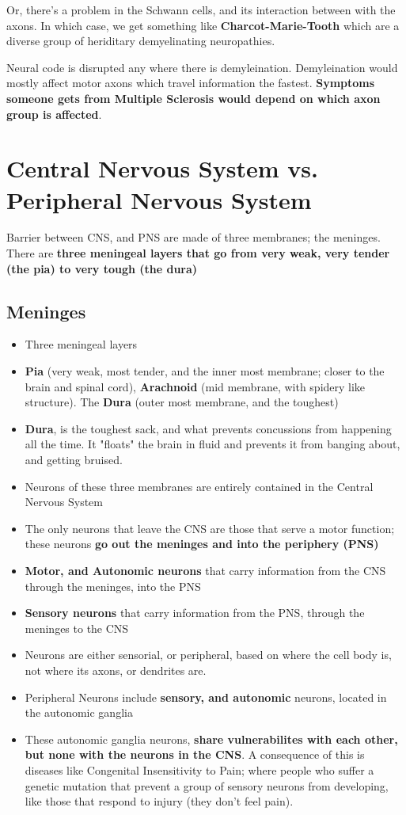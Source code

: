 \documentclass[12pt, a4paper]{article}
\begin{document}
Or, there's a problem in the Schwann cells, and its interaction between with the axons. In which case,
we get something like \textbf{Charcot-Marie-Tooth} which are a diverse group of heriditary demyelinating neuropathies.

Neural code is disrupted any where there is demyleination. Demyleination would mostly affect
motor axons which travel information the fastest. \textbf{Symptoms someone gets from Multiple Sclerosis would
depend on which axon group is affected}.

\section{Central Nervous System vs. Peripheral Nervous System}
Barrier between CNS, and PNS are made of three membranes; the meninges. There are 
\textbf{three meningeal layers that go from very weak, very tender (the pia) to very
tough (the dura)}

\subsection{Meninges}
\begin{itemize}
    \item Three meningeal layers
    \item \textbf{Pia} (very weak, most tender, and the inner most membrane; closer to the brain and spinal cord),
    \textbf{Arachnoid} (mid membrane, with spidery like structure). The \textbf{Dura} (outer most membrane, and the toughest)
    \item \textbf{Dura}, is the toughest sack, and what prevents concussions from happening all the time. It "floats"
    the brain in fluid and prevents it from banging about, and getting bruised.
    \item Neurons of these three membranes are entirely contained in the Central Nervous System
    \item The only neurons that leave the CNS are those that serve a motor function; these neurons
    \textbf{go out the meninges and into the periphery (PNS)}
    \item \textbf{Motor, and Autonomic neurons} that carry information from the CNS through the meninges, into the PNS
    \item \textbf{Sensory neurons} that carry information from the PNS, through the meninges to the CNS
    \item Neurons are either sensorial, or peripheral, based on where the cell body is, not where its
    axons, or dendrites are.
    \item Peripheral Neurons include \textbf{sensory, and autonomic} neurons, located in the autonomic ganglia
    \item These autonomic ganglia neurons, \textbf{share vulnerabilites with each other, but none with the neurons in the CNS}. A 
    consequence of this is diseases like Congenital Insensitivity to Pain; where people who suffer a genetic mutation
    that prevent a group of sensory neurons from developing, like those that respond to injury
    (they don't feel pain). 
\end{itemize}
\end{document}
